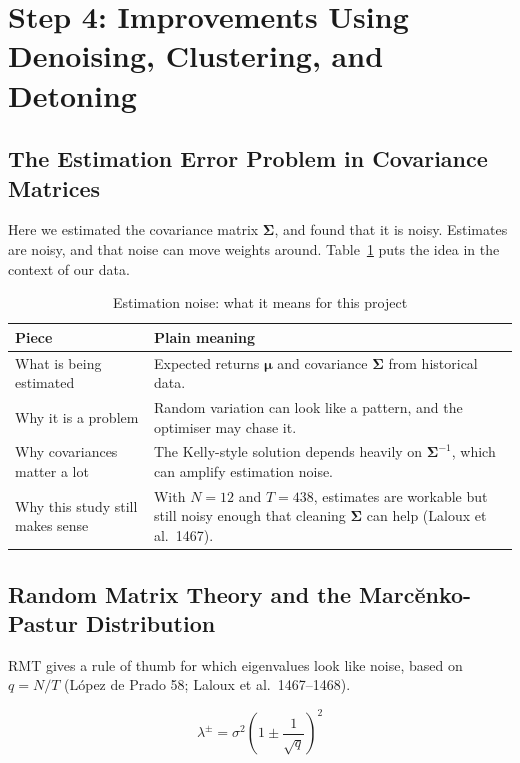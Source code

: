 \documentclass[11pt,a4paper]{article}
\begin{document}
\section{Step 4: Improvements Using Denoising, Clustering, and Detoning}

\subsection{The Estimation Error Problem in Covariance Matrices}

Here we estimated the covariance matrix $\bm{\Sigma}$, and found that it is noisy. Estimates are noisy, and that noise can move weights around. Table~\ref{tab:estimation_noise} puts the idea in the context of our data.  

\begin{table}[H]
\centering
\caption{Estimation noise: what it means for this project}
\label{tab:estimation_noise}
{\small\setlength{\tabcolsep}{4pt}\renewcommand{\arraystretch}{1.15}\begin{tabularx}{\textwidth}{>{\raggedright\arraybackslash}p{4.2cm} X}
\toprule
Piece & Plain meaning \\
\midrule
What is being estimated & Expected returns $\bm{\mu}$ and covariance $\bm{\Sigma}$ from historical data. \\
Why it is a problem & Random variation can look like a pattern, and the optimiser may chase it. \\
Why covariances matter a lot & The Kelly-style solution depends heavily on $\bm{\Sigma}^{-1}$, which can amplify estimation noise. \\
Why this study still makes sense & With $N=12$ and $T=438$, estimates are workable but still noisy enough that cleaning $\bm{\Sigma}$ can help (Laloux et al.\ 1467). \\
\bottomrule
\end{tabularx}}
\end{table}

\subsection{Random Matrix Theory and the Marc\u{e}nko-Pastur Distribution}

RMT gives a rule of thumb for which eigenvalues look like noise, based on $q=N/T$ (L\'{o}pez de Prado 58; Laloux et al.\ 1467--1468).

\[
\lambda^{\pm} = \sigma^2 \left(1 \pm \frac{1}{\sqrt{q}}\right)^2
\]
\end{document}
